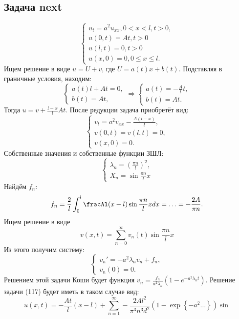 \documentclass[11pt]{article}
\begin{document}
\subsection{Задача next}
\label{sec:org47ad79a}
\begin{equation}
\begin{cases}
u_t = a^2u_{xx}, 0 < x < l, t > 0, \\
u(0, t) = At, t > 0 \\
u(l, t) = 0, t > 0 \\
u(x, 0) = 0, 0 \leq x \leq l.
\end{cases}
\end{equation}
Ищем решение в виде $u = U + v$, где $U = a(t)x + b(t)$. Подставляя в граничные условия, находим:
\begin{equation}
\begin{cases}
a(t)l + At = 0, \\
b(t) = At,
\end{cases}
\Rightarrow
\begin{cases}
a(t) = -\frac{A}lt, \\
b(t) = At.
\end{cases}
\end{equation}
Тогда $u = v + \frac{l - x}lAt$. После редукции задача приобретёт вид:
\begin{equation}
\begin{cases}
v_t = a^2v_{xx} - \frac{A(l - x)}l, \\
v(0, t) = v(l, t) = 0, \\
v(x, 0) = 0.
\end{cases}
\end{equation}
Собственные значения и собственные функции ЗШЛ:
\begin{equation}
\begin{cases}
\lambda_n = \left(\frac{\pi n}l\right)^2, \\
X_n = \sin\frac{\pi n}lx
\end{cases}
\end{equation}
Найдём $f_n$:
\begin{equation}
f_n = \frac2l\int_0^l\fracAl(x - l)\sin\frac{\pi n}lxdx = \ldots = -\frac{2A}{\pi n}.
\end{equation}
Ищем решение в виде
\begin{equation}
v(x, t) = \sum_{n = 0}^{\infty}v_n(t)\sin\frac{\pi n}lx
\end{equation}
Из этого получим систему:
\begin{equation}
\begin{cases}
v_n' = -a^2\lambda_nv_n + f_n, \\
v_n(0) = 0.
\end{cases}
\end{equation}
Решением этой задачи Коши будет функция $v_n = \frac{f_n}{a^2\lambda_n}(1 - e^{-a^2\lambda_nt})$.
Решение задачи (117) будет иметь в таком случае вид:
\begin{equation}
u(x, t) = -\frac{At}l(x - l) + \sum_{n = 1}^{\infty}-\frac{2Al^2}{\pi^3n^3d^2}\left(1 - \exp\left\{-a^2\ldots\right\}\right)\sin
\end{equation}
\end{document}
